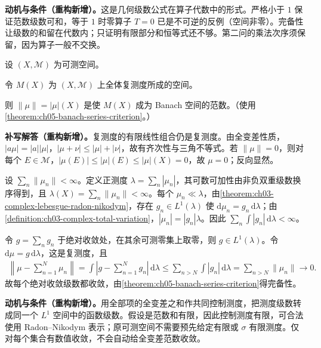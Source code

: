 \documentclass[../../main.tex]{subfiles}
\begin{document}
\begin{remark}
\textbf{动机与条件（重构新增）。}这是几何级数公式在算子代数中的形式。严格小于 $1$ 保证范数级数可和，等于 $1$ 时零算子 $T=0$ 已是不可逆的反例（空间非零）。完备性让级数的和留在代数内；只证明有限部分和恒等式还不够。第二问的乘法次序须保留，因为算子一般不交换。
\end{remark}
\begin{exercise}\label{exercise:ch05-measure-banach}
设 $(X,\mathscr M)$ 为可测空间。
\begin{definition*}[复测度空间]\label{definition:ch05-complex-measure-space}
令 $M(X)$ 为 $(X,\mathscr M)$ 上全体复测度所成的空间。
\end{definition*}
则 $\|\mu\|=|\mu|(X)$ 是使 $M(X)$ 成为 Banach 空间的范数。（使用\cref{theorem:ch05-banach-series-criterion}。）
\end{exercise}
\begin{solution}
\textbf{补写解答（重构新增）。}复测度的有限线性组合仍是复测度。由全变差性质，$|a\mu|=|a||\mu|$，$|\mu+\nu|\le|\mu|+|\nu|$，故有齐次性与三角不等式。若 $\|\mu\|=0$，则对每个 $E\in\mathscr M$，$|\mu(E)|\le|\mu|(E)\le|\mu|(X)=0$，故 $\mu=0$；反向显然。

设 $\sum_n\|\mu_n\|<\infty$。定义正测度 $\lambda=\sum_n|\mu_n|$，其可数可加性由非负双重级数换序得到，且 $\lambda(X)=\sum_n\|\mu_n\|<\infty$。每个 $\mu_n\ll\lambda$，由\cref{theorem:ch03-complex-lebesgue-radon-nikodym}，存在 $g_n\in L^1(\lambda)$ 使 $\mathrm d\mu_n=g_n\,\mathrm d\lambda$；由\cref{definition:ch03-complex-total-variation}，$|\mu_n|=|g_n|\lambda$。因此 $\sum_n\int|g_n|\,\mathrm d\lambda<\infty$。

令 $g=\sum_ng_n$ 于绝对收敛处，在其余可测零集上取零，则 $g\in L^1(\lambda)$。令 $\mathrm d\mu=g\,\mathrm d\lambda$，这是复测度，且
\begin{align*}
\left\|\mu-\sum_{n=1}^N\mu_n\right\|
=\int\left|g-\sum_{n=1}^Ng_n\right|\,\mathrm d\lambda
\le\sum_{n>N}\int|g_n|\,\mathrm d\lambda
=\sum_{n>N}\|\mu_n\|\longrightarrow0.
\end{align*}
故每个绝对收敛级数都收敛，由\cref{theorem:ch05-banach-series-criterion}得完备性。
\end{solution}
\begin{remark}
\textbf{动机与条件（重构新增）。}用全部项的全变差之和作共同控制测度，把测度级数转成同一个 $L^1$ 空间中的函数级数。假设是范数和有限，因此控制测度有限，可合法使用 Radon--Nikodym 表示；原可测空间不需要预先给定有限或 $\sigma$ 有限测度。仅对每个集合有数值收敛，不会自动给全变差范数收敛。
\end{remark}
\end{document}
